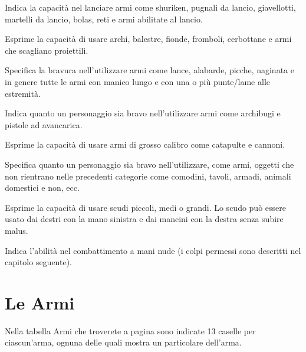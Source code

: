 Indica la capacit\`a nel lanciare armi come shuriken, pugnali da
lancio, giavellotti, martelli da lancio, bolas, reti e armi abilitate
al lancio.

 Esprime la capacit\`a
di usare archi, balestre, fionde, fromboli, cerbottane e armi che
scagliano proiettili.

\iffullversion
{} Specifica la
bravura nell'utilizzare armi come lance, alabarde, picche, naginata e
in genere tutte le armi con manico lungo e con una o pi\`u
punte/lame alle estremit\`a.

Indica quanto un personaggio sia bravo nell'utilizzare armi come
archibugi e pistole ad avancarica.

Esprime la capacit\`a di usare armi di grosso calibro come catapulte
e cannoni.


Specifica quanto un personaggio sia bravo nell'utilizzare, come armi,
oggetti che non rientrano nelle precedenti categorie come comodini,
tavoli, armadi, animali domestici e non, ecc.
\fi

 Esprime la
capacit\`a di usare scudi piccoli, medi o grandi. Lo scudo pu\`o
essere usato dai destri con la mano sinistra e dai mancini con la
destra senza subire malus.

Indica l'abilit\`a nel combattimento a mani nude 
\iffullversion
(i colpi
permessi sono descritti nel capitolo seguente).

\section{Le Armi}
Nella tabella Armi che troverete a pagina \pageref{tabarmi} sono
indicate 13 caselle per ciascun'arma, ognuna delle quali mostra un
particolare dell'arma.



